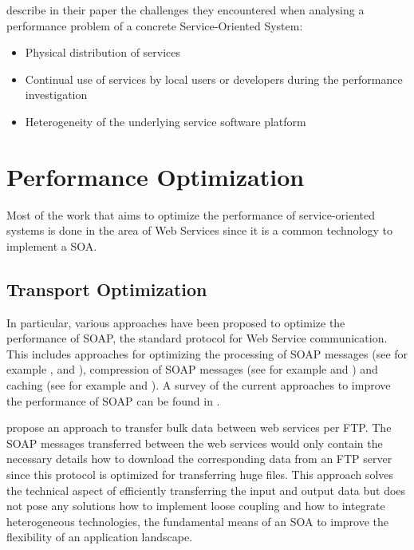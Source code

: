 \citet{Woodall:2007kx} describe in their paper the challenges they encountered when analysing a performance problem of a concrete Service-Oriented System:
\begin{itemize}
	\item Physical distribution of services
	\item Continual use of services by local users or developers during the performance investigation
	\item Heterogeneity of the underlying service software platform
\end{itemize}

\section{Performance Optimization}
Most of the work that aims to optimize the performance of service-oriented systems is done in the area of Web Services since it is a common technology to implement a SOA.

\subsection{Transport Optimization}

In particular, various approaches have been proposed to optimize the performance of SOAP, the standard protocol for Web Service communication. This includes approaches for optimizing the processing of SOAP messages (see for example \citet{Abu-Ghazaleh:2005bs}, \citet{Suzumura:2005fv} and \citet{Ng:2006kl}), compression of SOAP messages (see for example \citet{Estrella:2008dz} and \citet{Ng:2005qa}) and caching (see for example \citet{andresen2004lye} and \citet{Devaram:2003fu}). A survey of the current approaches to improve the performance of SOAP can be found in \cite{Tekli:2012bh}.

\citet{Wichaiwong:2007oq} propose an approach to transfer bulk data between web services per FTP. The SOAP messages transferred between the web services would only contain the necessary details how to download the corresponding data from an FTP server since this protocol is optimized for transferring huge files. This approach solves the technical aspect of efficiently transferring the input and output data but does not pose any solutions how to implement loose coupling and how to integrate heterogeneous technologies, the fundamental means of an SOA to improve the flexibility of an application landscape.

